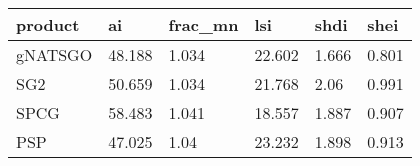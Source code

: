 % 
\begin{tabular}{llllll}
  \hline
product & ai & frac\_mn & lsi & shdi & shei \\ 
  \hline
gNATSGO & 48.188 & 1.034 & 22.602 & 1.666 & 0.801 \\ 
  SG2 & 50.659 & 1.034 & 21.768 & 2.06 & 0.991 \\ 
  SPCG & 58.483 & 1.041 & 18.557 & 1.887 & 0.907 \\ 
  PSP & 47.025 & 1.04 & 23.232 & 1.898 & 0.913 \\ 
   \hline
\end{tabular}
